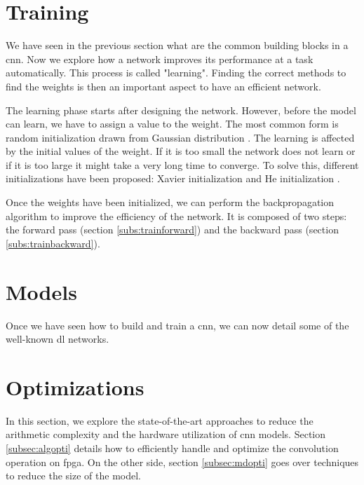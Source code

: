 \section{Training} \label{sec:train}
We have seen in the previous section what are the common building blocks in a \acrshort{cnn}. Now we explore how a network improves its performance at a task automatically. This process is called "learning". Finding the correct methods to find the weights is then an important aspect to have an efficient network.

The learning phase starts after designing the network. However, before the model can learn, we have to assign a value to the weight. The most common form is random initialization drawn from Gaussian distribution \cite{he_delving_2015}. The learning is affected by the initial values of the weight. If it is too small the network does not learn or if it is too large it might take a very long time to converge. To solve this, different initializations have been proposed: Xavier initialization \cite{glorot_understanding_2010} and He initialization \cite{he_delving_2015}.

Once the weights have been initialized, we can perform the backpropagation algorithm to improve the efficiency of the network. It is composed of two steps: the forward pass (section \ref{subs:trainforward}) and the backward pass (section \ref{subs:trainbackward}).
%
%

%

%
%
\section{Models}
Once we have seen how to build and train a \acrshort{cnn}, we can now detail some of the well-known \acrshort{dl} networks.
%

%
%
\section{Optimizations}
%
%
In this section, we explore the state-of-the-art approaches to reduce the arithmetic complexity and the hardware utilization of \acrshort{cnn} models. Section \ref{subsec:algopti} details how to efficiently handle and optimize the convolution operation on \acrshort{fpga}. On the other side, section \ref{subsec:mdopti} goes over techniques to reduce the size of the model.
%

%

